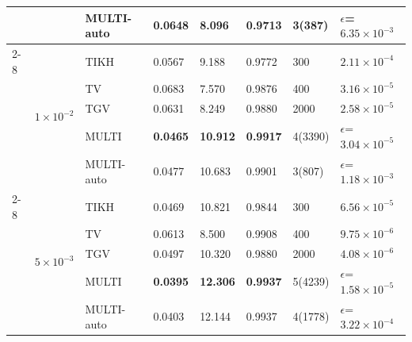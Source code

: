 \begin{tabular}{llllllll}
 &  & MULTI-auto & 0.0648 & 8.096 & 0.9713 & 3(387) & $\epsilon$=$6.35\times 10^{-3}$ \\
\cmidrule{2-8}
 & \multirow{5}{*}{$1\times 10^{-2}$} & TIKH & 0.0567 & 9.188 & 0.9772 & 300 & $2.11\times 10^{-4}$ \\
 &  & TV & 0.0683 & 7.570 & 0.9876 & 400 & $3.16\times 10^{-5}$ \\
 &  & TGV & 0.0631 & 8.249 & 0.9880 & 2000 & $2.58\times 10^{-5}$ \\
 &  & MULTI & \textbf{0.0465} & \textbf{10.912} & \textbf{0.9917} & 4(3390) & $\epsilon$=$3.04\times 10^{-5}$ \\
 &  & MULTI-auto & 0.0477 & 10.683 & 0.9901 & 3(807) & $\epsilon$=$1.18\times 10^{-3}$ \\
\cmidrule{2-8}
 & \multirow{5}{*}{$5\times 10^{-3}$} & TIKH & 0.0469 & 10.821 & 0.9844 & 300 & $6.56\times 10^{-5}$ \\
 &  & TV & 0.0613 & 8.500 & 0.9908 & 400 & $9.75\times 10^{-6}$ \\
 &  & TGV & 0.0497 & 10.320 & 0.9880 & 2000 & $4.08\times 10^{-6}$ \\
 &  & MULTI & \textbf{0.0395} & \textbf{12.306} & \textbf{0.9937} & 5(4239) & $\epsilon$=$1.58\times 10^{-5}$ \\
 &  & MULTI-auto & 0.0403 & 12.144 & 0.9937 & 4(1778) & $\epsilon$=$3.22\times 10^{-4}$ \\
\bottomrule
\end{tabular}